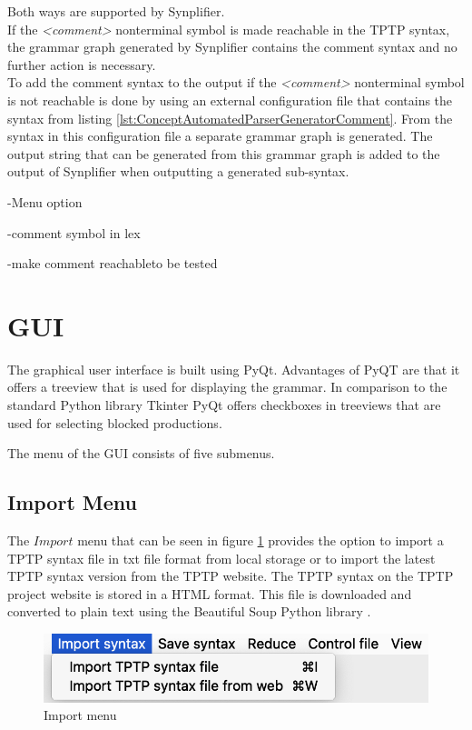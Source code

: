 Both ways are supported by \ac{Synplifier}.\\
If the \textit{<comment>} nonterminal symbol is made reachable in the \ac{TPTP} syntax, the grammar graph generated by \ac{Synplifier} contains the comment syntax and no further action is necessary.\\
To add the comment syntax to the output if the \textit{<comment>} nonterminal symbol is not reachable is done by using an external configuration file that contains the syntax from listing \ref{lst:ConceptAutomatedParserGeneratorComment}.
From the syntax in this configuration file a separate grammar graph is generated. The output string that can be generated from this grammar graph is added to the output of \ac{Synplifier} when outputting a generated sub-syntax.

-Menu option

-comment symbol in lex

-make comment reachableto be tested
\section{GUI}\label{sec:ConceptGUI}
The graphical user interface is built using PyQt. Advantages of PyQT are that it offers a treeview that is used for displaying the grammar. In comparison to the standard Python library Tkinter PyQt offers checkboxes in treeviews \cite{Tkinter} that are used for selecting blocked productions.

The menu of the GUI consists of five submenus.

\subsection{Import Menu}\label{sec:ConceptGUIImportMenu}

The $Import$ menu that can be seen in figure \ref{fig:import} provides the option to import a \ac{TPTP} syntax file in txt file format from local storage or to import the latest \ac{TPTP} syntax version from the \ac{TPTP} website.
The \ac{TPTP} syntax on the \ac{TPTP} project website is stored in a HTML format.
This file is downloaded and converted to plain text using the Beautiful Soup Python library \cite{BeautifulSoup}.

\begin{figure}[H]
\centering
\includegraphics[width=.7\textwidth]{images/import.png}
\caption{Import menu}
\label{fig:import}
\end{figure}

